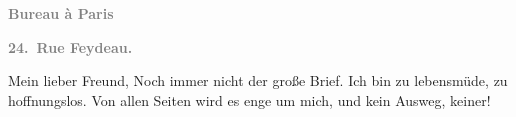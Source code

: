 \pstart
           \begin{otherlanguage}{french}\textcolor{gray}{\textbf{\textbf{Bureau à Paris}}}\end{otherlanguage}\pend
           
\pstart
           \begin{otherlanguage}{french}\textcolor{gray}{\textbf{\textbf{24. Rue Feydeau.}}}\end{otherlanguage}\pend
           
\pstart\center{}Mein lieber Freund,\pend\vspace{0.5em}
\pstart
           Noch immer nicht der große Brief. Ich bin zu lebensmüde, zu hoffnungslos. Von allen
               Seiten wird es enge um mich, und kein Ausweg, keiner!\pend
           

